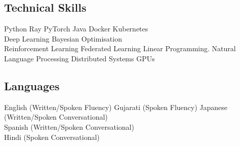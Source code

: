 \documentclass[a4paper]{deedy-resume} %
\begin{document}
\begin{minipage}[t]{0.45\textwidth}

    \subsection{Technical Skills}
    Python \textbullet{} Ray \textbullet{} PyTorch \textbullet{} Java \textbullet{} Docker \textbullet{} Kubernetes  \\  \textbullet{} Deep Learning \textbullet{} Bayesian Optimisation \textbullet{} \\ Reinforcement Learning \textbullet{} Federated Learning \textbullet{} Linear Programming. \textbullet{} Natural Language Processing \textbullet{} Distributed Systems \textbullet{} GPUs

\end{minipage}
\begin{minipage}[t]{10\textwidth}
\end{minipage}
\begin{minipage}[t]{0.45\textwidth}
    \subsection{Languages}
    English (Written/Spoken Fluency) \textbullet{} Gujarati (Spoken Fluency) \textbullet{} Japanese (Written/Spoken Conversational) \textbullet{} \\  Spanish (Written/Spoken Conversational)  \textbullet{} \\  Hindi (Spoken Conversational)

\end{minipage}
\end{document}
